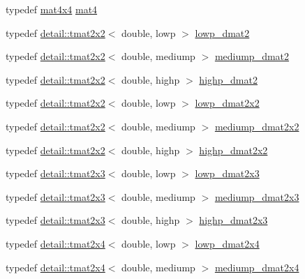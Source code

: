 \begin{DoxyCompactItemize}
typedef \hyperlink{group__core__types_ga63e3ee9447ed593484140a9368e738ec}{mat4x4} \hyperlink{group__core__types_ga7dcd2365c2e368e6af5b7adeb6a9c8df}{mat4}
\item 
typedef \hyperlink{structglm_1_1detail_1_1tmat2x2}{detail\+::tmat2x2}$<$ double, lowp $>$ \hyperlink{group__core__precision_ga5e08c45dfef867e0326a1eee95060cd0}{lowp\+\_\+dmat2}
\item 
typedef \hyperlink{structglm_1_1detail_1_1tmat2x2}{detail\+::tmat2x2}$<$ double, mediump $>$ \hyperlink{group__core__precision_gac056ec9d1c37e591172544088163b7e4}{mediump\+\_\+dmat2}
\item 
typedef \hyperlink{structglm_1_1detail_1_1tmat2x2}{detail\+::tmat2x2}$<$ double, highp $>$ \hyperlink{group__core__precision_ga9b158b3b722fe991bb66f7e65f136e68}{highp\+\_\+dmat2}
\item 
typedef \hyperlink{structglm_1_1detail_1_1tmat2x2}{detail\+::tmat2x2}$<$ double, lowp $>$ \hyperlink{group__core__precision_ga68b486ff22814c1a3781378513a9fcc0}{lowp\+\_\+dmat2x2}
\item 
typedef \hyperlink{structglm_1_1detail_1_1tmat2x2}{detail\+::tmat2x2}$<$ double, mediump $>$ \hyperlink{group__core__precision_ga88ddb4188060ab00fee67c9840f4417e}{mediump\+\_\+dmat2x2}
\item 
typedef \hyperlink{structglm_1_1detail_1_1tmat2x2}{detail\+::tmat2x2}$<$ double, highp $>$ \hyperlink{group__core__precision_gaa5e35f6570d394c1cd34f411a473220c}{highp\+\_\+dmat2x2}
\item 
typedef \hyperlink{structglm_1_1detail_1_1tmat2x3}{detail\+::tmat2x3}$<$ double, lowp $>$ \hyperlink{group__core__precision_ga2c7432984a35cf72050870a54485ef35}{lowp\+\_\+dmat2x3}
\item 
typedef \hyperlink{structglm_1_1detail_1_1tmat2x3}{detail\+::tmat2x3}$<$ double, mediump $>$ \hyperlink{group__core__precision_ga734e988edf759c7012c443014acb6674}{mediump\+\_\+dmat2x3}
\item 
typedef \hyperlink{structglm_1_1detail_1_1tmat2x3}{detail\+::tmat2x3}$<$ double, highp $>$ \hyperlink{group__core__precision_gafec7367665f006f2a7643103c5eddc38}{highp\+\_\+dmat2x3}
\item 
typedef \hyperlink{structglm_1_1detail_1_1tmat2x4}{detail\+::tmat2x4}$<$ double, lowp $>$ \hyperlink{group__core__precision_gac2285cef559b0dc35cb9a7f22e6a2dd8}{lowp\+\_\+dmat2x4}
\item 
typedef \hyperlink{structglm_1_1detail_1_1tmat2x4}{detail\+::tmat2x4}$<$ double, mediump $>$ \hyperlink{group__core__precision_gadb60bf60ef2b8da4a28a372b2bcca3a3}{mediump\+\_\+dmat2x4}

\end{DoxyCompactItemize}
